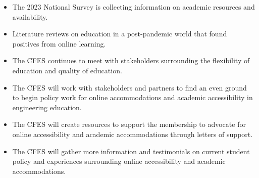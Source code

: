 \begin{itemize}
 \item The 2023 National Survey is collecting information on academic resources and availability.
 \item Literature reviews on education in a post-pandemic world that found positives from online learning.
 \item The CFES continues to meet with stakeholders surrounding the flexibility of education and quality of education.
\end{itemize}

\begin{itemize}
 \item The CFES will work with stakeholders and partners to find an even ground to begin policy work for online accommodations and academic accessibility in engineering education.
 \item The CFES will create resources to support the membership to advocate for online accessibility and academic accommodations through letters of support.
 \item The CFES will gather more information and testimonials on current student policy and experiences surrounding online accessibility and academic accommodations.
\end{itemize}

\newpage
